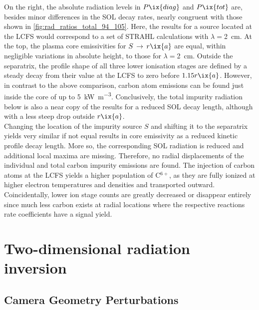             On the right, the absolute radiation levels in $P\ix{diag}$ and $P\ix{tot}$ are, besides minor differences in the SOL decay rates, nearly congruent with those shown in \cref{fig:rad_ratios_total_94_105}. Here, the results for a source located at the LCFS would correspond to a set of STRAHL calculations with $\lambda=$\SI{2}{\centi\meter}. At the top, the plasma core emissivities for $S\,\rightarrow\,r\ix{a}$ are equal, within negligible variations in absolute height, to those for $\lambda=$\SI{2}{\centi\meter}. Outside the separatrix, the profile shape of all three lower ionisation stages are defined by a steady decay from their value at the LCFS to zero before $1.15r\ix{a}$. However, in contrast to the above comparison, carbon atom emissions can be found just inside the core of up to \SI{5}{\kilo\watt\per\cubic\meter}. Conclusively, the total impurity radiation below is also a near copy of the results for a reduced SOL decay length, although with a less steep drop outside $r\ix{a}$.\\%
            Changing the location of the impurity source $S$ and shifting it to the separatrix yields very similar if not equal results in core emissivity as a reduced kinetic profile decay length. More so, the corresponding SOL radiation is reduced and additional local maxima are missing. Therefore, no radial displacements of the individual and total carbon impurity emissions are found. The injection of carbon atoms at the LCFS yields a higher population of C$^{6+}$, as they are fully ionized at higher electron temperatures and densities and transported outward. Coincidentally, lower ion stage counts are greatly decreased or disappear entirely since much less carbon exists at radial locations where the respective reactions rate coefficients have a signal yield.%
%
\chapter{Two-dimensional radiation inversion}\label{apx:mfr}%
%
    \section{Camera Geometry Perturbations}\label{apx:geompertub}%
%
